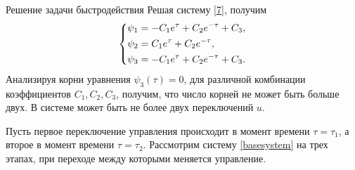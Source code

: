 \documentclass[10pt]{beamer}
\begin{document}
\begin{frame}{Решение задачи быстродействия}
	Решая систему \eqref{7}, получим
	\[
		\left\{ {\begin{aligned}
					 & \psi_1 = -C_1e^\tau+C_2e^{-\tau}+C_3, \hfill  \\
					 & \psi_2 = C_1e^\tau+C_2e^{-\tau} , \hfill      \\
					 & \psi_3 = -C_1e^\tau+C_2e^{-\tau}+C_3 . \hfill \\
				\end{aligned}} \right.
	\]
	Анализируя корни уравнения $\psi_3(\tau)=0$, для различной комбинации
	коэффициентов $C_1,C_2,C_3$, получим, что число корней не может быть больше двух. В системе может быть не более двух переключений $u$.

	Пусть первое переключение управления происходит в момент времени
	$\tau=\tau_1$, а второе в момент времени
	$\tau=\tau_2$. Рассмотрим систему \eqref{basesystem} на трех этапах,
	при переходе между которыми меняется управление.


\end{frame}
\end{document}
